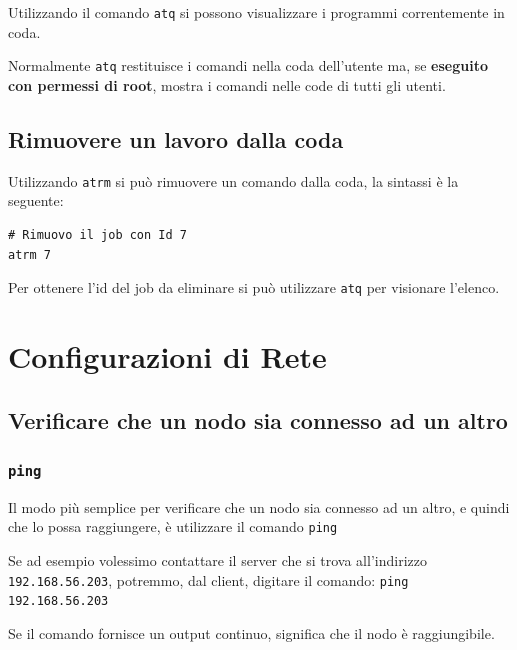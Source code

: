 \documentclass[a4paper]{report}
\newenvironment{info}{\begin{tcolorbox}[fonttitle=\sffamily\bfseries\large,title=Info,colframe=blue!75!white]}{\end{tcolorbox}}
\newenvironment{code}{\begin{tcolorbox}[size=small]}{\end{tcolorbox}}
\begin{document}
Utilizzando il comando \texttt{atq} si possono visualizzare i programmi correntemente in coda.

\begin{info}
	Normalmente \texttt{atq} restituisce i comandi nella coda dell'utente ma, se \textbf{eseguito con permessi di root}, mostra i comandi nelle code di tutti gli utenti.
\end{info}

\section{Rimuovere un lavoro dalla coda}

Utilizzando \texttt{atrm} si può rimuovere un comando dalla coda, la sintassi è la seguente:

\begin{code}
\begin{lstlisting}
# Rimuovo il job con Id 7
atrm 7
\end{lstlisting}
\end{code}

\begin{info}
	Per ottenere l'id del job da eliminare si può utilizzare \texttt{atq} per visionare l'elenco.
\end{info}

\chapter{Configurazioni di Rete}

\section{Verificare che un nodo sia connesso ad un altro}

\subsection{\texttt{ping}}

Il modo più semplice per verificare che un nodo sia connesso ad un altro, e quindi che lo possa raggiungere, è utilizzare il comando \texttt{ping}

Se ad esempio volessimo contattare il server che si trova all'indirizzo \texttt{192.168.56.203}, potremmo, dal client, digitare il comando: \texttt{ping 192.168.56.203}

Se il comando fornisce un output continuo, significa che il nodo è raggiungibile.
\end{document}
